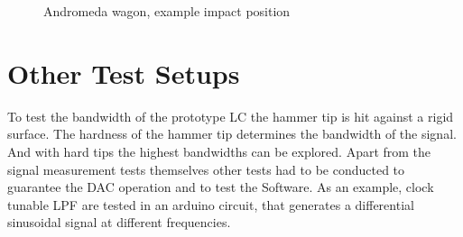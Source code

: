 \begin{figure}[!htb]
  \centering
    \hspace{4em}
  \caption[Andromeda Example Positions]{Andromeda wagon, example impact position%
    \label{fig:andromeda_positions}}
\end{figure}

\section{Other Test Setups}

To test the bandwidth of the prototype \ac{LC} the hammer tip is hit against a rigid surface. The hardness of the hammer tip determines the bandwidth of the signal. And with hard tips the highest bandwidths can be explored. Apart from the signal measurement tests themselves other tests had to be conducted to guarantee the \ac{DAC} operation and to test the Software. As an example, clock tunable \ac{LPF} are tested in an arduino circuit, that generates a differential sinusoidal signal at different frequencies.
